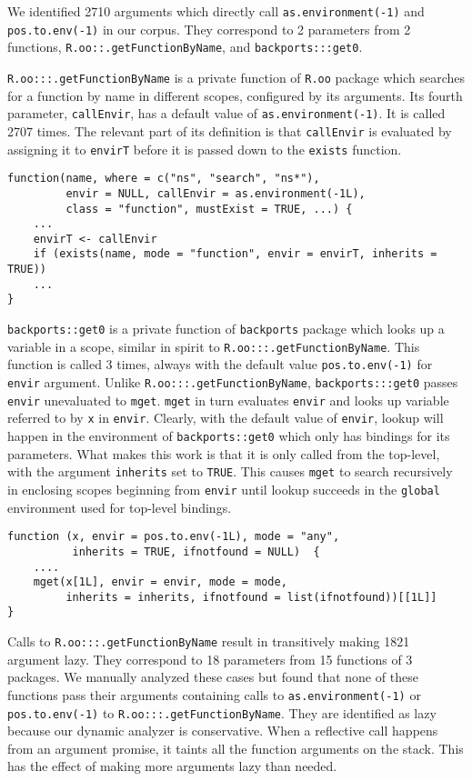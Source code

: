 \documentclass[screen,acmsmall]{acmart}
\newcommand{\code}[1]{\lstinline[style=R]|#1|\xspace}
\begin{document}
We identified 2710 arguments which directly call \code{as.environment(-1)} and
\code{pos.to.env(-1)} in our corpus. They correspond to 2 parameters from 2
functions, \code{R.oo::.getFunctionByName}, and \code{backports:::get0}.

\code{R.oo:::.getFunctionByName} is a private function of \code{R.oo} package
which searches for a function by name in different scopes, configured by its
arguments. Its fourth parameter, \code{callEnvir}, has a default value of
\code{as.environment(-1)}. It is called 2707 times. The relevant part of its
definition is that \code{callEnvir} is evaluated by assigning it to
\code{envirT} before it is passed down to the \code{exists} function.

\begin{lstlisting}
function(name, where = c("ns", "search", "ns*"),
         envir = NULL, callEnvir = as.environment(-1L),
         class = "function", mustExist = TRUE, ...) {
    ...
    envirT <- callEnvir
    if (exists(name, mode = "function", envir = envirT, inherits = TRUE))
    ...
}
\end{lstlisting}

\code{backports::get0} is a private function of \code{backports} package which
looks up a variable in a scope, similar in spirit to
\code{R.oo:::.getFunctionByName}. This function is called 3 times, always with
the default value \code{pos.to.env(-1)} for \code{envir} argument. Unlike
\code{R.oo:::.getFunctionByName}, \code{backports:::get0} passes \code{envir}
unevaluated to \code{mget}. \code{mget} in turn evaluates \code{envir} and looks
up variable referred to by \code{x} in \code{envir}. Clearly, with the default
value of \code{envir}, lookup will happen in the environment of
\code{backports::get0} which only has bindings for its parameters. What makes
this work is that it is only called from the top-level, with the argument
\code{inherits} set to \code{TRUE}. This causes \code{mget} to search
recursively in enclosing scopes beginning from \code{envir} until lookup
succeeds in the \code{global} environment used for top-level bindings.

\begin{lstlisting}
function (x, envir = pos.to.env(-1L), mode = "any",
          inherits = TRUE, ifnotfound = NULL)  {
    ....
    mget(x[1L], envir = envir, mode = mode,
         inherits = inherits, ifnotfound = list(ifnotfound))[[1L]]
}
\end{lstlisting}

Calls to \code{R.oo:::.getFunctionByName} result in transitively making 1821
argument lazy. They correspond to 18 parameters from 15 functions of 3 packages.
We manually analyzed these cases but found that none of these functions pass
their arguments containing calls to \code{as.environment(-1)} or
\code{pos.to.env(-1)} to \code{R.oo:::.getFunctionByName}. They are identified
as lazy because our dynamic analyzer is conservative. When a reflective call
happens from an argument promise, it taints all the function arguments on the
stack. This has the effect of making more arguments lazy than needed.
\end{document}
